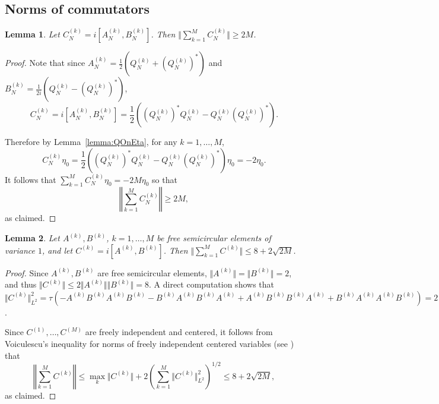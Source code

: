 \documentclass[11pt]{article}
\newtheorem{lemma}{Lemma}
\begin{document}
\subsection{Norms of commutators}

\begin{lemma} \label{lemma:normOfCommutator}
    Let \(C_N^{(k)} = i [ A_N^{(k)} , B_N^{(k)}]\). 
                  Then \(
                  \Vert \sum_{k=1}^M C_N^{(k)}\Vert \geq 2M
                  \).
\end{lemma}
\begin{proof}
Note that since $ A_N^{(k)} = \frac{1}{2}(Q_{N}^{(k)} + (Q_N^{(k)})^*)$
and $B_N^{(k)} = \frac{1}{2i}(Q_{N}^{(k)} - (Q_N^{(k)})^*)$, 
\[
C_N^{(k)} = i [ A_N^{(k)} , B_N^{(k)} ] 
= \frac12\left((Q_N^{(k)})^*Q_N^{(k)}
                  -Q_N^{(k)}(Q_N^{(k)})^*\right).
\]
        
Therefore by Lemma~\ref{lemma:QOnEta}, for any $k=1,\dots,M$,
\[
C^{(k)}_N \eta_0 = \frac12\left((Q_N^{(k)})^*Q_N^{(k)}
                  -Q_N^{(k)}(Q_N^{(k)})^*\right) \eta_0 = -2\eta_0. 
\]
It follows that
\(
 \sum_{k=1}^M C^{(k)}_N \eta_0 = -2M \eta_0
\) so that 
\[
\left\Vert \sum_{k=1}^M C_N^{(k)} \right\Vert \geq 2M,
\] as claimed. \end{proof}


\begin{lemma}\label{lemma:freeNorms}
    Let $A^{(k)}, B^{(k)}$, $k=1,\dots,M$ be free semicircular elements of variance $1$, and let $C^{(k)} = i [A^{(k)},B^{(k)}]$.  Then $\Vert \sum_{k=1}^M C^{(k)} \Vert \leq 8  + 2\sqrt{2M}$.
\end{lemma}

\begin{proof}
    Since $A^{(k)}, B^{(k)}$ are free semicircular elements, $\Vert A^{(k)}\Vert = \Vert B^{(k)}\Vert = 2$, and thus $\Vert C^{(k)}\Vert \leq 2 \Vert A^{(k)}\Vert \Vert B^{(k)}\Vert = 8$. A direct computation   shows that $\Vert C^{(k)}\Vert_{L^2}^2 = \tau(-A^{(k)}B^{(k)}A^{(k)}B^{(k)}-B^{(k)}A^{(k)}B^{(k)}A^{(k)}+A^{(k)}B^{(k)}B^{(k)}A^{(k)}+B^{(k)}A^{(k)}A^{(k)}B^{(k)})= 2$.

    Since $C^{(1)},\dots,C^{(M)}$ are freely independent and centered, it follows from Voiculescu's inequality for norms of freely independent centered variables (see \cite[Lemma 3.2]{Voiculescu:Norm}) that 
    \[ \left\Vert \sum_{k=1}^M C^{(k)} \right\Vert   \leq \max_{k} \Vert C^{(k)} \Vert + 2\left(\sum_{k=1}^M \Vert C^{(k)}\Vert_{L^2}^2  \right)^{1/2}
     \leq 8  + 2\sqrt{2M},\] 
    as claimed. 
\end{proof}
\end{document}
